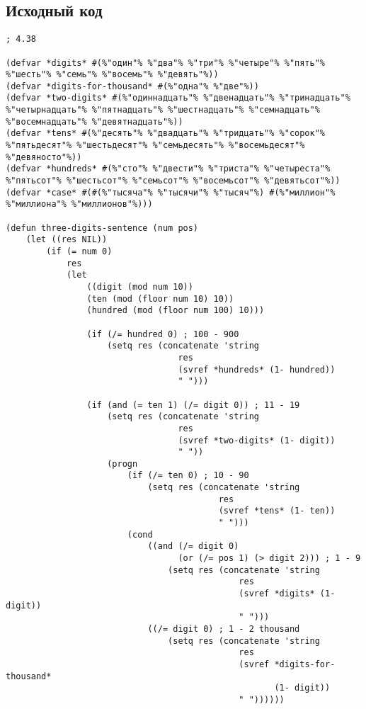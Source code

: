 \documentclass[12pt]{article}
\begin{document}
\subsection{Исходный код}
\begin{lstlisting}[escapechar=\%, basicstyle=\footnotesize]
; 4.38

(defvar *digits* #(%"один"% %"два"% %"три"% %"четыре"% %"пять"% %"шесть"% %"семь"% %"восемь"% %"девять"%))
(defvar *digits-for-thousand* #(%"одна"% %"две"%))
(defvar *two-digits* #(%"одиннадцать"% %"двенадцать"% %"тринадцать"% %"четырнадцать"% %"пятнадцать"% %"шестнадцать"% %"семнадцать"% %"восемнадцать"% %"девятнадцать"%))
(defvar *tens* #(%"десять"% %"двадцать"% %"тридцать"% %"сорок"% %"пятьдесят"% %"шестьдесят"% %"семьдесять"% %"восемьдесят"% %"девяносто"%))
(defvar *hundreds* #(%"сто"% %"двести"% %"триста"% %"четыреста"% %"пятьсот"% %"шестьсот"% %"семьсот"% %"восемьсот"% %"девятьсот"%))
(defvar *case* #(#(%"тысяча"% %"тысячи"% %"тысяч"%) #(%"миллион"% %"миллиона"% %"миллионов"%)))

(defun three-digits-sentence (num pos)
    (let ((res NIL))
        (if (= num 0)
            res
            (let 
                ((digit (mod num 10))
                (ten (mod (floor num 10) 10))
                (hundred (mod (floor num 100) 10)))

                (if (/= hundred 0) ; 100 - 900
                    (setq res (concatenate 'string 
                                  res 
                                  (svref *hundreds* (1- hundred)) 
                                  " ")))

                (if (and (= ten 1) (/= digit 0)) ; 11 - 19
                    (setq res (concatenate 'string 
                                  res 
                                  (svref *two-digits* (1- digit)) 
                                  " "))
                    (progn 
                        (if (/= ten 0) ; 10 - 90
                            (setq res (concatenate 'string 
                                          res 
                                          (svref *tens* (1- ten)) 
                                          " ")))
                        (cond
                            ((and (/= digit 0) 
                                  (or (/= pos 1) (> digit 2))) ; 1 - 9
                                (setq res (concatenate 'string 
                                              res 
                                              (svref *digits* (1- digit)) 
                                              " ")))
                            ((/= digit 0) ; 1 - 2 thousand
                                (setq res (concatenate 'string 
                                              res 
                                              (svref *digits-for-thousand* 
                                                     (1- digit)) 
                                              " "))))))
                

\end{lstlisting}
\end{document}
